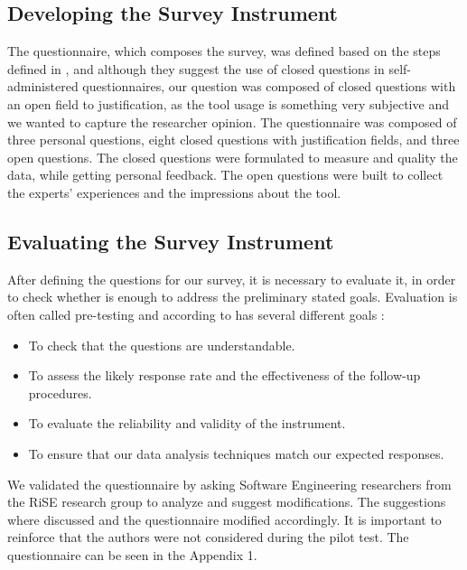 \subsection{Developing the Survey Instrument}

The  questionnaire,  which  composes  the survey,  was  defined  based  on  the  steps  defined  in \cite{Kitchenham2008} , and although they suggest the  use  of  closed  questions  in  self-administered  questionnaires,  our question was composed of closed questions with an open field to justification,  as the tool usage is something very subjective and we wanted to capture  the  researcher  opinion. The questionnaire was composed of three personal questions, eight  closed questions with justification fields, and three open questions. The closed questions were formulated to measure and quality the data, while getting personal feedback. The open questions were built to collect the experts’ experiences and the impressions about the tool.


\subsection{Evaluating the Survey Instrument}



After defining the questions for our survey, it is necessary to evaluate it, in order to check whether is enough to address the preliminary stated goals. Evaluation is often called pre-testing and according to \cite{Kitchenham2008} has several different goals :

\begin{itemize}
\item To check that the questions are understandable.
\item To  assess  the  likely  response  rate  and  the  effectiveness  of  the  follow-up procedures.
\item To evaluate the reliability and validity of the instrument.
\item To ensure that our data analysis techniques match our expected responses.
\end{itemize}


We validated the  questionnaire  by  asking Software  Engineering researchers from the RiSE research group to analyze and suggest modifications. The suggestions where discussed and the questionnaire modified accordingly.  It is important to reinforce that the authors were not considered during the pilot test. The questionnaire can be seen in the Appendix 1.



